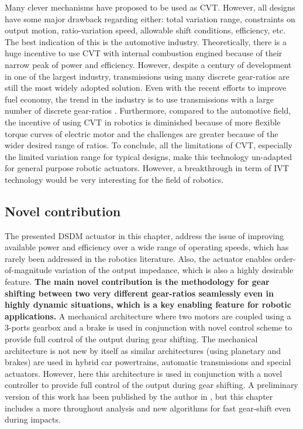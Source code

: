 Many clever mechanisms have proposed to be used as CVT. However, all designs have some major drawback regarding either: total variation range, constraints on output motion, ratio-variation speed, allowable shift conditions, efficiency, etc. The best indication of this is the automotive industry. Theoretically, there is a huge incentive to use CVT with internal combustion engined because of their narrow peak of power and efficiency. However, despite a century of development in one of the largest industry, transmissions using many discrete gear-ratios are still the most widely adopted solution. Even with the recent efforts to improve fuel economy, the trend in the industry is to use transmissions with a large number of discrete gear-ratios \cite{phillips_10-speed_2010}\cite{goleski_multi-speed_2015}. Furthermore, compared to the automotive field, the incentive of using CVT in robotics is diminished because of more flexible torque curves of electric motor and the challenges are greater because of the wider desired range of ratios. To conclude, all the limitations of CVT, especially the limited variation range for typical designs, make this technology un-adapted for general purpose robotic actuators. However, a breakthrough in term of IVT technology would be very interesting for the field of robotics.

\subsection{Novel contribution}

The presented DSDM actuator in this chapter, address the issue of improving available power and efficiency over a wide range of operating speeds, which has rarely been addressed in the robotics literature. Also, the actuator enables order-of-magnitude variation of the output impedance, which is also a highly desirable feature.  \textbf{The main novel contribution is the methodology for gear shifting between two very different gear-ratios seamlessly even in highly dynamic situations, which is a key enabling feature for robotic applications.} A mechanical architecture where two motors are coupled using a 3-ports gearbox and a brake is used in conjunction with novel control scheme to provide full control of the output during gear shifting. The mechanical architecture is not new by itself as similar architectures (using planetary and brakes) are used in hybrid car powertrains, automatic transmissions and special actuators. However, here this architecture is used in conjunction with a novel controller to provide full control of the output during gear shifting. A preliminary version of this work has been published  by the author in \cite{girard_two-speed_2015}, but this chapter includes a more throughout analysis and new algorithms for fast gear-shift even during impacts. 

